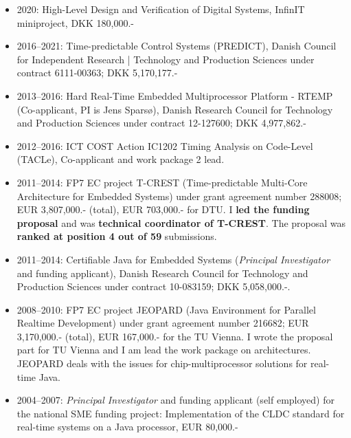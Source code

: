 \documentclass[%
    a4paper,
    11pt, %
    headinclude, footexclude,
    notitlepage,
    headsepline,
    pointlessnumbers,
    ]{scrartcl}
\begin{document}
\begin{itemize}

\item 2020: High-Level Design and Verification of Digital Systems, InfinIT miniproject, DKK 180,000.-

\item 2016--2021: Time-predictable Control Systems (PREDICT),
Danish Council for Independent Research | Technology and Production
  Sciences under contract 6111-00363; DKK 5,170,177.-
  
  \item 2013--2016: Hard Real-Time Embedded Multiprocessor Platform - RTEMP
  (Co-applicant, PI is Jens Spars{\o}), 
  Danish Research Council for Technology and Production
  Sciences under contract 12-127600; DKK 4,977,862.-
  
  \item 2012--2016: ICT COST Action IC1202 Timing Analysis on Code-Level (TACLe),
  Co-applicant and work package 2 lead.
  
  \item 2011--2014: FP7 EC project T-CREST (Time-predictable
  Multi-Core Architecture for Embedded Systems) under grant
  agreement number 288008; EUR 3,807,000.- (total), EUR 703,000.- for DTU.
  I \textbf{led the funding proposal} and was \textbf{technical coordinator of T-CREST}.
  The proposal was \textbf{ranked at position 4 out of 59} submissions.
  
  \item 2011--2014: Certifiable Java for Embedded Systems (\emph{Principal Investigator} and funding applicant),
   Danish Research Council for Technology and Production
   Sciences under contract 10-083159; DKK 5,058,000.-.
   
  \item 2008--2010: FP7 EC project JEOPARD (Java Environment for
      Parallel Realtime Development) under grant agreement number
      216682; EUR 3,170,000.- (total), EUR 167,000.- for the TU
      Vienna. I wrote the proposal part for TU Vienna and I am
      lead the work package on architectures. JEOPARD
      deals with the issues for chip-multiprocessor solutions for
      real-time Java.
      
  \item 2004--2007: \emph{Principal Investigator} and funding
      applicant (self employed) for the national SME funding
      project: Implementation of the CLDC standard for real-time
      systems on a Java processor, EUR 80,000.-
      
\end{itemize}
\end{document}
